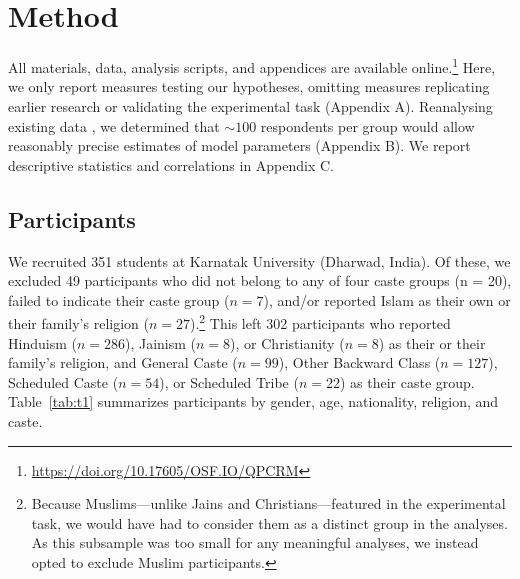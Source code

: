 \documentclass[12pt, a4paper]{article}
\begin{document}
\section{Method}

All materials, data, analysis scripts, and appendices are available online.\footnote{\protect\href{https://doi.org/10.17605/OSF.IO/QPCRM}{https://doi.org/10.17605/OSF.IO/QPCRM}} Here, we only report measures testing our hypotheses, omitting measures replicating earlier research or validating the experimental task (Appendix A). Reanalysing existing data \parencite{van_dommelen_construing_2015}, we determined that $\sim 100$ respondents per group would allow reasonably precise estimates of model parameters (Appendix B). We report descriptive statistics and correlations in Appendix C.

\subsection{Participants}

We recruited 351 students at Karnatak University (Dharwad, India). Of these, we excluded 49 participants who did not belong to any of four caste groups (n = 20), failed to indicate their caste group ($n = 7$), and/or reported Islam as their own or their family’s religion ($n = 27$).\footnote{Because Muslims---unlike Jains and Christians---featured in the experimental task, we would have had to consider them as a distinct group in the analyses. As this subsample was too small for any meaningful analyses, we instead opted to exclude Muslim participants.} This left 302 participants who reported Hinduism ($n = 286$), Jainism ($n = 8$), or Christianity ($n = 8$) as their or their family’s religion, and General Caste ($n = 99$), Other Backward Class ($n = 127$), Scheduled Caste ($n = 54$), or Scheduled Tribe ($n = 22$) as their caste group. Table~\ref{tab:t1} summarizes participants by gender, age, nationality, religion, and caste.
\end{document}
